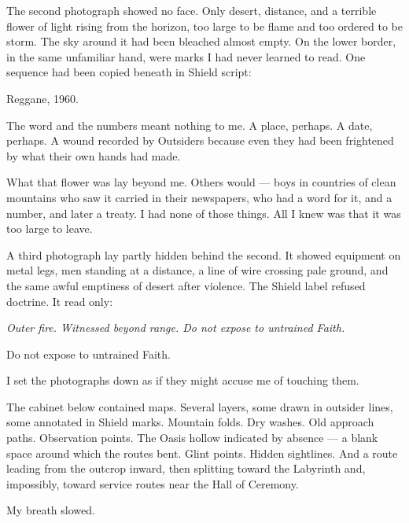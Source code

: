 \ornament


The second photograph showed no face. Only desert, distance, and a terrible flower of light rising from the horizon, too large to be flame and too ordered to be storm. The sky around it had been bleached almost empty. On the lower border, in the same unfamiliar hand, were marks I had never learned to read. One sequence had been copied beneath in Shield script:\par

Reggane, 1960.\par

The word and the numbers meant nothing to me. A place, perhaps. A date, perhaps. A wound recorded by Outsiders because even they had been frightened by what their own hands had made.\par

What that flower was lay beyond me. Others would --- boys in countries of clean mountains who saw it carried in their newspapers, who had a word for it, and a number, and later a treaty. I had none of those things. All I knew was that it was too large to leave.\par

A third photograph lay partly hidden behind the second. It showed equipment on metal legs, men standing at a distance, a line of wire crossing pale ground, and the same awful emptiness of desert after violence. The Shield label refused doctrine. It read only:\par

\textit{Outer fire. Witnessed beyond range. Do not expose to untrained Faith.}\par

Do not expose to untrained Faith.\par

I set the photographs down as if they might accuse me of touching them.\par

The cabinet below contained maps. Several layers, some drawn in outsider lines, some annotated in Shield marks. Mountain folds. Dry washes. Old approach paths. Observation points. The Oasis hollow indicated by absence --- a blank space around which the routes bent. Glint points. Hidden sightlines. And a route leading from the outcrop inward, then splitting toward the Labyrinth and, impossibly, toward service routes near the Hall of Ceremony.\par

My breath slowed.\par

